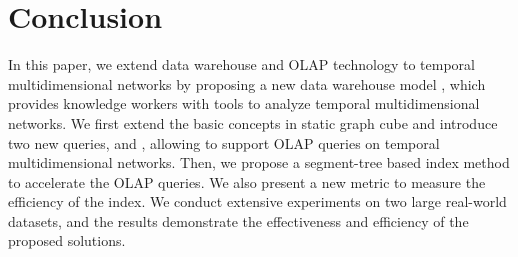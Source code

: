 \documentclass[10pt,journal,compsoc]{IEEEtran}
\begin{document}
\section{Conclusion} \label{sec:conclusion}
In this paper, we extend data warehouse and OLAP technology to temporal multidimensional networks by proposing a new data warehouse model , which provides knowledge workers with tools to analyze temporal multidimensional networks. We first extend the basic concepts in static graph cube and introduce two new queries,  and , allowing  to support OLAP queries on temporal multidimensional networks. Then, we propose a segment-tree based index method to accelerate the OLAP queries. We also present a new metric to measure the efficiency of the index. We conduct extensive experiments on two large real-world datasets, and the results demonstrate the effectiveness and efficiency of the proposed solutions. 




\end{document}
